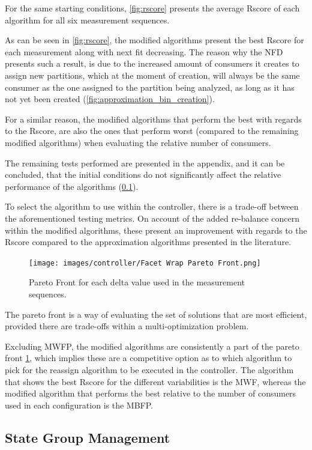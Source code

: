 For the same starting conditions, \ref{fig:rscore} presents the average Rscore
of each algorithm for all six measurement sequences.

As can be seen in \ref{fig:rscore}, the modified algorithms present the best
Rscore for each measurement along with next fit decreasing. The reason why the
NFD presents such a result, is due to the increased amount of consumers it
creates to assign new partitions, which at the moment of creation, will always
be the same consumer as the one assigned to the partition being analyzed, as
long as it has not yet been created (\ref{fig:approximation_bin_creation}).

For a similar reason, the modified algorithms that perform the best with regards
to the Rscore, are also the ones that perform worst (compared to the remaining
modified algorithms) when evaluating the relative number of consumers.

The remaining tests performed are presented in the appendix, and it can be
concluded, that the initial conditions do not significantly affect the relative
performance of the algorithms (\ref{}).

To select the algorithm to use within the controller, there is a trade-off
between the aforementioned testing metrics. On account of the added re-balance
concern within the modified algorithms, these present an improvement with
regards to the Rscore compared to the approximation algorithms presented in the
literature.

\begin{figure}[H] \centering
\texttt{[image: images/controller/Facet Wrap Pareto
Front.png]} \caption{Pareto Front for each delta value used in the measurement
sequences.} \label{fig:pareto_front} \end{figure}

The pareto front is a way of evaluating the set of solutions that are most
efficient, provided there are trade-offs within a multi-optimization problem.

Excluding MWFP, the modified algorithms are consistently a part of the pareto
front \ref{fig:pareto_front}, which implies these are a competitive option as to
which algorithm to pick for the reassign algorithm to be executed in the
controller. The algorithm that shows the best Rscore for the different
variabilities is the MWF, whereas the modified algorithm that performs the best
relative to the number of consumers used in each configuration is the MBFP.

\subsection{State Group Management}


